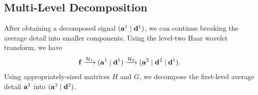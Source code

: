 \documentclass{article}
\theoremstyle{definition}
\newtheorem{example}[definition]{Example}
\begin{document}

  \subsection{Multi-Level Decomposition}
  After obtaining a decomposed signal \((\vb{a}^1 \mid \vb{d}^1)\), we can continue breaking the average detail into smaller components. Using the level-two Haar wavelet transform, we have
  \begin{equation*}
    \vb{f} \xrightarrow{\mathcal{H}_1} (\vb{a}^1 \mid \vb{d}^1) \xrightarrow{\mathcal{H}_2} (\vb{a}^2 \mid \vb{d}^2 \mid \vb{d}^1).
  \end{equation*}
  Using appropriately-sized matrices \(H\) and \(G\), we decompose the first-level average detail \(\vb{a}^1\) into \((\vb{a}^2 \mid \vb{d}^2)\).

\end{document}
